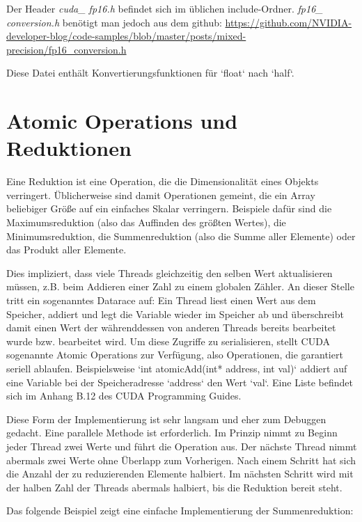 		Der Header \textit{cuda\_ fp16.h} befindet sich im üblichen include-Ordner. \textit{fp16\_ conversion.h} benötigt man jedoch aus dem github: \url{https://github.com/NVIDIA-developer-blog/code-samples/blob/master/posts/mixed-precision/fp16_conversion.h}
		
		Diese Datei enthält Konvertierungsfunktionen für \li`float` nach \li`half`.
	
		
		\section{Atomic Operations und Reduktionen}\label{red}
		Eine Reduktion ist eine Operation, die die Dimensionalität eines Objekts verringert. Üblicherweise sind damit Operationen gemeint, die ein Array beliebiger Größe auf ein einfaches Skalar verringern. Beispiele dafür sind die Maximumsreduktion (also das Auffinden des größten Wertes), die Minimumsreduktion, die Summenreduktion (also die Summe aller Elemente) oder das Produkt aller Elemente. 
		
		Dies impliziert, dass viele \Glspl{Thread} gleichzeitig den selben Wert aktualisieren müssen, z.B. beim Addieren einer Zahl zu einem globalen Zähler. An dieser Stelle tritt ein sogenanntes Datarace auf: Ein \Gls{Thread} liest einen Wert aus dem Speicher, addiert und legt die Variable wieder im Speicher ab und überschreibt damit einen Wert der währenddessen von anderen \Glspl{Thread} bereits bearbeitet wurde bzw. bearbeitet wird. Um diese Zugriffe zu serialisieren, stellt CUDA sogenannte Atomic Operations zur Verfügung, also Operationen, die garantiert seriell ablaufen. Beispielsweise \li`int atomicAdd(int* address, int val)` addiert auf eine Variable bei der Speicheradresse \li`address` den Wert \li`val`. Eine Liste befindet sich im Anhang B.12 des CUDA Programming Guides. \autocite{cudaPG}
		
		Diese Form der Implementierung ist sehr langsam und eher zum Debuggen gedacht. Eine parallele Methode ist erforderlich. Im Prinzip nimmt zu Beginn jeder \Gls{Thread} zwei Werte und führt die Operation aus. Der nächste \Gls{Thread} nimmt abermals zwei Werte ohne Überlapp zum Vorherigen. Nach einem Schritt hat sich die Anzahl der zu reduzierenden Elemente halbiert. Im nächsten Schritt wird mit der halben Zahl der \Glspl{Thread} abermals halbiert, bis die Reduktion bereit steht.
		
		Das folgende Beispiel zeigt eine einfache Implementierung der Summenreduktion:
		
